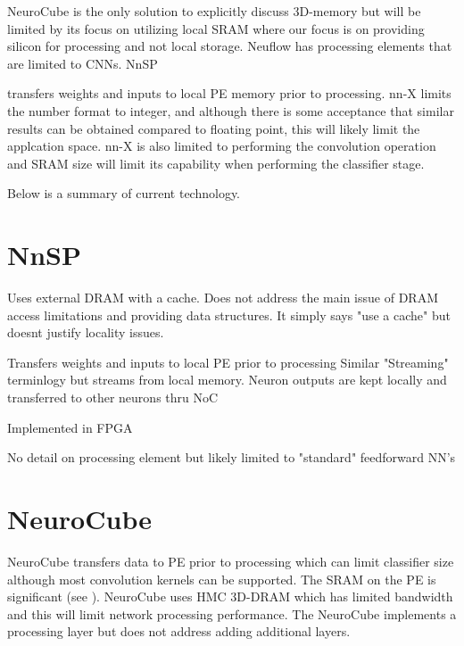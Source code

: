 {{%
\iffalse

NeuroCube\cite{kim2016neurocube} is the only solution to explicitly discuss 3D-memory but will be limited by its focus on utilizing local SRAM where our focus is on
providing silicon for processing and not local storage.
Neuflow\cite{farabet2011neuflow} has processing elements that are limited to CNNs.
NnSP{\cite{esmaeilzadeh2005nnsp} transfers weights and inputs to local PE memory prior to processing.
nn-X\cite{gokhale2014240} limits the number format to integer, and although there is some acceptance that similar
results can be obtained compared to floating point, this will likely limit the applcation space. 
nn-X is also limited to performing the convolution operation and SRAM size will limit its capability when performing the classifier stage.

Below is a summary of current technology.

\section[NnSP]{NnSP{\cite{esmaeilzadeh2005nnsp}}}

Uses external DRAM with a cache.
 Does not address the main issue of DRAM access limitations and providing data structures.
 It simply says "use a cache" but doesnt justify locality issues.

Transfers weights and inputs to local PE prior to processing
Similar "Streaming" terminlogy but streams from local memory.
Neuron outputs are kept locally and transferred to other neurons thru NoC

Implemented in FPGA

No detail on processing element but likely limited to "standard" feedforward NN's


\section[NeuroCube]{NeuroCube{\cite{kim2016neurocube}}}
NeuroCube\cite{kim2016neurocube} transfers data to PE prior to processing which can limit classifier size although most
convolution kernels can be supported.
The SRAM on the PE is significant (see ).
NeuroCube uses HMC 3D-DRAM which has limited bandwidth and this will limit network processing performance.
The NeuroCube implements a processing layer but does not address adding additional layers. 

}}}
